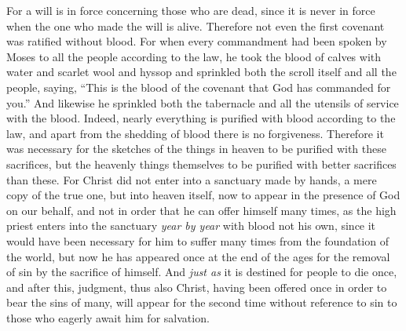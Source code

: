 \begin{biblechapter}
\verse For a will is in force concerning those who are dead, since it is never in force when the one who made the will is alive.
\verse Therefore not even the first covenant was ratified without blood.
\verse For when every commandment had been spoken by Moses to all the people according to the law, he took the blood of calves with water and scarlet wool and hyssop and sprinkled both the scroll itself and all the people,
\verse saying, “This is the blood of the covenant that God has commanded for you.”
\verse And likewise he sprinkled both the tabernacle and all the utensils of service with the blood.
\verse Indeed, nearly everything is purified with blood according to the law, and apart from the shedding of blood there is no forgiveness.
\verse Therefore it was necessary for the sketches of the things in heaven to be purified with these sacrifices, but the heavenly things themselves to be purified with better sacrifices than these.
\verse For Christ did not enter into a sanctuary made by hands, a mere copy of the true one, but into heaven itself, now to appear in the presence of God on our behalf,
\verse and not in order that he can offer himself many times, as the high priest enters into the sanctuary \textit{year by year} with blood not his own,
\verse since it would have been necessary for him to suffer many times from the foundation of the world, but now he has appeared once at the end of the ages for the removal of sin by the sacrifice of himself.
\verse And \textit{just as} it is destined for people to die once, and after this, judgment,
\verse thus also Christ, having been offered once in order to bear the sins of many, will appear for the second time without reference to sin to those who eagerly await him for salvation.
\end{biblechapter}

